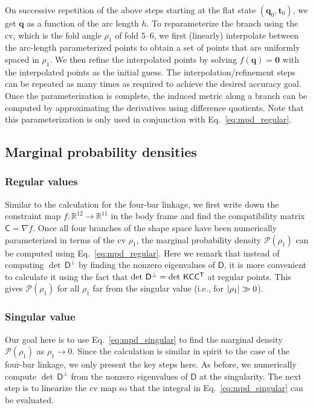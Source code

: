 On successive repetition of the above steps starting at the flat state $(\bm{q}_0, \bm{t}_0)$, we get $\bm{q}$ as a function of the arc length $h$.
To reparameterize the branch using the \ac{cv}, which is the fold angle $\rho_{1}$ of fold 5--6, we first (linearly) interpolate between the arc-length parameterized points to obtain a set of points that are uniformly spaced in $\rho_{1}$.
We then refine the interpolated points by solving $f(\bm{q}) = \bm{0}$ with the interpolated points as the initial guess.
The interpolation/refinement steps can be repeated as many times as required to achieve the desired accuracy goal.
Once the parameterization is complete, the induced metric along a branch can be computed by approximating the derivatives using difference quotients.
Note that this parameterization is only used in conjunction with Eq.~\eqref{eq:mpd_regular}.

\subsection{Marginal probability densities}

\subsubsection*{Regular values}

Similar to the calculation for the four-bar linkage, we first write down the constraint map $f: \mathbb{R}^{12} \to \mathbb{R}^{11}$ in the body frame and find the compatibility matrix $\mathsf{C} = \nabla f$.
Once all four branches of the shape space have been numerically parameterized in terms of the \ac{cv} $\rho_{1}$, the marginal probability density $\mathscr{P}(\rho_{1})$ can be computed using Eq.~\eqref{eq:mpd_regular}.
Here we remark that instead of computing $\det\,\mathsf{D}^{\perp}$ by finding the nonzero eigenvalues of $\mathsf{D}$, it is more convenient to calculate it using the fact that $\det\,\mathsf{D}^{\perp} = \det\,\mathsf{K}\mathsf{C}\mathsf{C}^\mathsf{T}$ at regular points.
This gives $\mathscr{P}(\rho_{1})$ for all $\rho_{1}$ far from the singular value (i.e., for $\lvert\rho_{1}\rvert \gg 0$).

\subsubsection*{Singular value}

Our goal here is to use Eq.~\eqref{eq:mpd_singular} to find the marginal density $\mathscr{P}(\rho_{1})$ as $\rho_{1} \to 0$.
Since the calculation is similar in spirit to the case of the four-bar linkage, we only present the key steps here.
As before, we numerically compute $\det\,\mathsf{D}^{\perp}$ from the nonzero eigenvalues of $\mathsf{D}$ at the singularity.
The next step is to linearize the \ac{cv} map so that the integral in Eq.~\eqref{eq:mpd_singular} can be evaluated.

